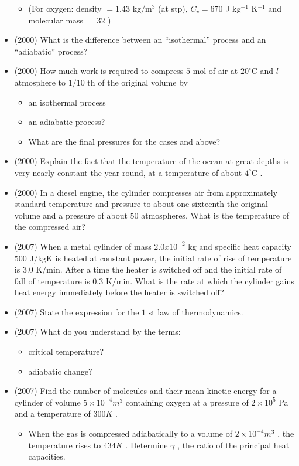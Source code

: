 \documentclass{article}
\begin{document}
\begin{itemize}
\begin{itemize}
\item (For oxygen: density $ =1.43$ kg$/$m$ ^{3}$ (at stp), $ C_v =670$ J kg$ ^{-1}$ K$ ^{-1}$ and molecular mass $ =32$ )
\end{itemize}
\item (2000)  What is the difference between an “isothermal” process and an “adiabatic” process?
\item (2000)  How much work is required to compress $ 5$ mol of air at $ 20^{\circ}$C and $ l$ atmosphere to $ 1/10$ th of the original volume by\begin{itemize}
\item an isothermal process
\item an adiabatic process?
\item What are the final pressures for the cases and above?
\end{itemize}
\item (2000)  Explain the fact that the temperature of the ocean at great depths is very nearly constant the year round, at a temperature of about $ 4^{\circ}$C .
\item (2000)  In a diesel engine, the cylinder compresses air from approximately standard temperature and pressure to about one-sixteenth the original volume and a pressure of about $ 50$ atmospheres. What is the temperature of the compressed air?
\item (2007)  When a metal cylinder of mass $ 2.0x10^{-2}$ kg and specific heat capacity $ 500$ J$/$kgK is heated at constant power, the initial rate of rise of temperature is $ 3.0$ K$/$min.  After a time the heater is switched off and the initial rate of fall of temperature is $ 0.3$ K$/$min.  What is the rate at which the cylinder gains heat energy immediately before the heater is switched off?
\item (2007)  State the expression for the $ 1$ st law of thermodynamics.
\item (2007)  What do you understand by the terms:\begin{itemize}
\item critical temperature? 
\item adiabatic change?
\end{itemize}
\item (2007)  Find the number of molecules and their mean kinetic energy for a cylinder of volume $ 5 \times 10^{-4}m^{3}$ containing oxygen at a pressure of $ 2 \times 10^{5}$ Pa and a temperature of $ 300K$ . \begin{itemize}
\item When the gas is compressed adiabatically to a volume of $ 2 \times 10^{-4}m^{3}$ , the temperature rises to $ 434K$ . Determine $ \gamma $ , the ratio of the principal heat capacities.

\end{itemize}
\end{itemize}
\end{document}
